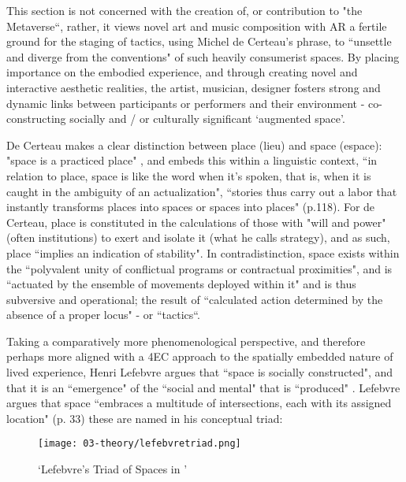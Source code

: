 This section is not concerned with the creation of, or contribution to "the Metaverse``, rather, it views novel art and music composition with AR a fertile ground for the staging of tactics, using Michel de Certeau's phrase, to ``unsettle and diverge from the conventions" \citeyearpar[p. 36]{decerteau1984} of such heavily consumerist spaces. By placing importance on the embodied experience, and through creating novel and interactive aesthetic realities, the artist, musician, designer fosters strong and dynamic links between participants or performers and their environment - co-constructing socially and / or culturally significant `augmented space'.

De Certeau makes a clear distinction between place (lieu) and space (espace): "space is a practiced place"  \citeyearpar[p. 117]{decerteau1984}, and embeds this within a linguistic context, ``in relation to place, space is like the word when it's spoken, that is, when it is caught in the ambiguity of an actualization", ``stories thus carry out a labor that instantly transforms places into spaces or spaces into places" (p.118). For de Certeau, place is constituted in the calculations of those with "will and power" (often institutions) to exert and isolate it (what he calls strategy), and as such, place ``implies an indication of stability". In contradistinction, space exists within the ``polyvalent unity of conflictual programs or contractual proximities", and is ``actuated by the ensemble of movements deployed within it" and is thus subversive and operational; the result of ``calculated action determined by the absence of a proper locus" - or ``tactics``. 

Taking a comparatively more phenomenological perspective, and therefore perhaps more aligned with a 4EC approach to the spatially embedded nature of lived experience, Henri Lefebvre argues that ``space is socially constructed", and that it is an ``emergence" of the ``social and mental" that is ``produced"  \citeyearpar[p. 260]{lefebvre1991}. Lefebvre argues that space ``embraces a multitude of intersections, each with its assigned location" (p. 33) these are named in his conceptual triad:

\begin{figure}[bth]
    \myfloatalign
    {\texttt{[image: 03-theory/lefebvretriad.png]}}
    \caption[`Lefebvre's Triad of Spaces in (Günzel, 2019, p.14)']{`Lefebvre's Triad of Spaces in \citep[p. 14]{gunzel2019}'}\label{fig: lefebvretriad}
\end{figure}

